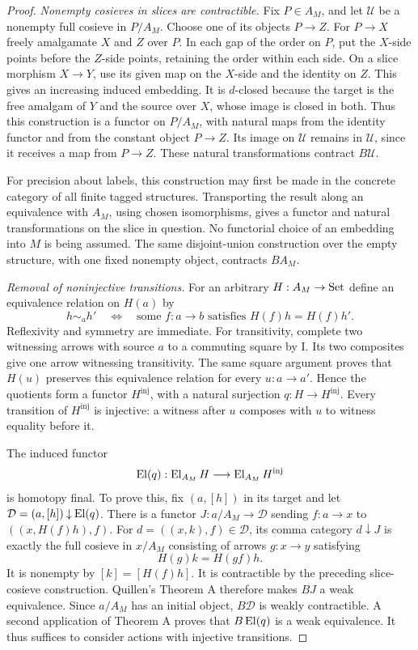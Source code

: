 \begin{proof}
\emph{Nonempty cosieves in slices are contractible.}
Fix $P\in A_M$, and let $\mathcal U$ be a nonempty full cosieve
in $P/A_M$. Choose one of its objects $P\to Z$.
For $P\to X$ freely amalgamate $X$ and $Z$ over $P$.
In each gap of the order on $P$, put the $X$-side points before
the $Z$-side points, retaining the order within each side. On a
slice morphism $X\to Y$, use its given map on the $X$-side and
the identity on $Z$. This gives an increasing induced embedding.
It is $d$-closed because the target is the free amalgam of $Y$
and the source over $X$, whose image is closed in both. Thus this
construction is a functor on $P/A_M$, with natural maps from the
identity functor and from the constant object $P\to Z$.
Its image on $\mathcal U$ remains in $\mathcal U$, since it
receives a map from $P\to Z$. These natural transformations
contract $B\mathcal U$.

For precision about labels, this construction may first be made in
the concrete category of all finite tagged structures. Transporting
the result along an equivalence with $A_M$, using chosen
isomorphisms, gives a functor and natural transformations on the
slice in question. No functorial choice of an embedding into $M$
is being assumed. The same disjoint-union construction over the
empty structure, with one fixed nonempty object, contracts $BA_M$.

\emph{Removal of noninjective transitions.}
For an arbitrary $H:A_M\to\mathrm{Set}$ define an equivalence relation on
$H(a)$ by
\[
 h\sim_a h'\quad\Longleftrightarrow\quad
 \text{some }f:a\to b\text{ satisfies }H(f)h=H(f)h'.
\]
Reflexivity and symmetry are immediate. For transitivity, complete
two witnessing arrows with source $a$ to a commuting square by I.
Its two composites give one arrow witnessing transitivity. The
same square argument proves that $H(u)$ preserves this equivalence
relation for every $u:a\to a'$. Hence the quotients form a functor
$H^{\mathrm{inj}}$, with a natural surjection $q:H\to H^{\mathrm{inj}}$.
Every transition of $H^{\mathrm{inj}}$ is injective: a witness
after $u$ composes with $u$ to witness equality before it.

The induced functor
\[
             \operatorname{El}(q):\operatorname{El}_{A_M}H\longrightarrow\operatorname{El}_{A_M}H^{\mathrm{inj}}
\]
is homotopy final. To prove this, fix $(a,[h])$ in its target and
let $\mathcal D=(a,[h])\mathbin\downarrow\operatorname{El}(q)$.
There is a functor $J:a/A_M\to\mathcal D$ sending
$f:a\to x$ to $((x,H(f)h),f)$. For
$d=((x,k),f)\in\mathcal D$, its comma category $d\downarrow J$
is exactly the full cosieve in $x/A_M$ consisting of arrows
$g:x\to y$ satisfying
\[
                         H(g)k=H(gf)h.
\]
It is nonempty by $[k]=[H(f)h]$. It is contractible by the preceding
slice-cosieve construction. Quillen's Theorem A therefore makes
$BJ$ a weak equivalence. Since $a/A_M$ has an initial object,
$B\mathcal D$ is weakly contractible. A second application of
Theorem A proves that $B\operatorname{El}(q)$ is a weak equivalence. It thus
suffices to consider actions with injective transitions.


\end{proof}
